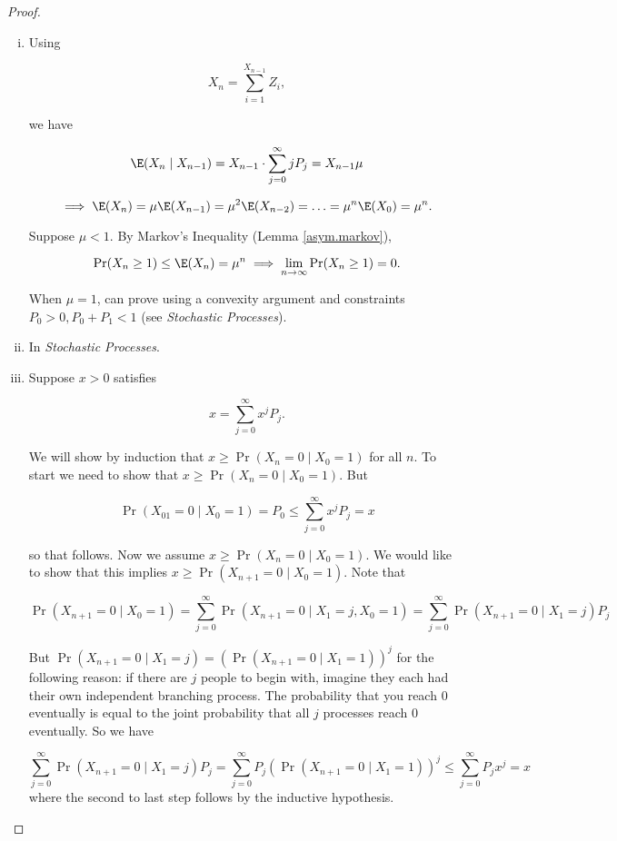\begin{proof}

\begin{enumerate}[(i)]

\item Using 

\[
X_n = \sum_{i=1}^{X_{n-1}} Z_i,
\]

we have

\[
\E(X_n \mid X_{n-1}) = X_{n-1} \cdot \sum_{j=0}^\infty j P_j = X_{n-1} \mu
\]

\[
\implies \E(X_n) = \mu \E(X_{n-1}) = \mu^2 \E(X_{n-2}) = \ldots = \mu^n \E(X_0) = \mu^n.
\]

Suppose \(\mu < 1\). By Markov's Inequality (Lemma \ref{asym.markov}),

\[
\Pr(X_n \geq 1) \leq \E(X_n) = \mu^n  \implies \lim_{n \to \infty} \Pr(X_n \geq 1) = 0.
\]

When \(\mu = 1\), can prove using a convexity argument and constraints \(P_0 > 0, P_0 + P_1 < 1\) (see \textit{Stochastic Processes}).

\item In \textit{Stochastic Processes}.

\item Suppose \(x > 0\) satisfies

\[
x = \sum_{j =0}^\infty x^j P_j.
\]

We will show by induction that \(x \geq \Pr(X_n = 0 \mid X_0 = 1) \) for all \(n\). To start we need to show that  \(x \geq \Pr(X_n = 0 \mid X_0 = 1)\). But 

\[
\Pr(X_01 = 0 \mid X_0 = 1) = P_0 \leq \sum_{j =0}^\infty x^j P_j = x
\]

so that follows. Now we assume \(x \geq \Pr(X_n = 0 \mid X_0 = 1)\). We would like to show that this implies \(x \geq \Pr(X_{n+1} = 0 \mid X_0 =1)\). Note that

\[
\Pr(X_{n+1} = 0 \mid X_0 =1) = \sum_{j=0}^\infty \Pr(X_{n+1} = 0 \mid X_1 = j, X_0 =1)  = \sum_{j=0}^\infty \Pr(X_{n+1} = 0 \mid X_1 = j) P_j 
\]

But \(\Pr(X_{n+1} = 0 \mid X_1 = j) = (\Pr(X_{n+1} = 0 \mid X_1 = 1) )^j\) for the following reason: if there are \(j\) people to begin with, imagine they each had their own independent branching process. The probability that you reach 0 eventually is equal to the joint probability that all \(j\) processes reach 0 eventually. So we have

\[
\sum_{j=0}^\infty \Pr(X_{n+1} = 0 \mid X_1 = j) P_j = \sum_{j=0}^\infty P_j  (\Pr(X_{n+1} = 0 \mid X_1 = 1) )^j \leq \sum_{j=0}^\infty P_j x^j = x
\]
where the second to last step follows by the inductive hypothesis.


\end{enumerate}

\end{proof}

